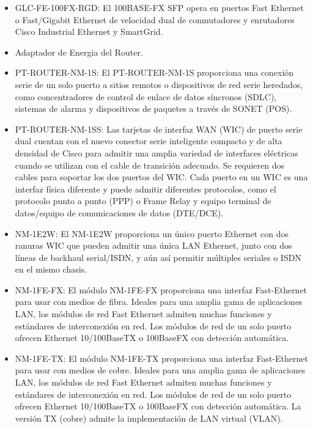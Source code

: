 \documentclass{article}
\begin{document}
\begin{itemize}
    \item GLC-FE-100FX-RGD: El 100BASE-FX SFP opera en puertos Fast Ethernet o Fast/Gigabit Ethernet de velocidad dual de conmutadores y enrutadores Cisco Industrial Ethernet y SmartGrid.

    \item Adaptador de Energia del Router.

    \item PT-ROUTER-NM-1S: El PT-ROUTER-NM-1S proporciona una conexión serie de un solo puerto a sitios remotos o dispositivos de red serie heredados, como concentradores de control de enlace de datos síncronos (SDLC), sistemas de alarma y dispositivos de paquetes a través de SONET (POS).

    \item PT-ROUTER-NM-1SS: Las tarjetas de interfaz WAN (WIC) de puerto serie dual cuentan con el nuevo conector serie inteligente compacto y de alta densidad de Cisco para admitir una amplia variedad de interfaces eléctricas cuando se utilizan con el cable de transición adecuado. Se requieren dos cables para soportar los dos puertos del WIC. Cada puerto en un WIC es una interfaz física diferente y puede admitir diferentes protocolos, como el protocolo punto a punto (PPP) o Frame Relay y equipo terminal de datos/equipo de comunicaciones de datos (DTE/DCE).

    \item NM-1E2W: El NM-1E2W proporciona un único puerto Ethernet con dos ranuras WIC que pueden admitir una única LAN Ethernet, junto con dos líneas de backhaul serial/ISDN, y aún así permitir múltiples seriales o ISDN en el mismo chasis.

    \item NM-1FE-FX: El módulo NM-1FE-FX proporciona una interfaz Fast-Ethernet para usar con medios de fibra. Ideales para una amplia gama de aplicaciones LAN, los módulos de red Fast Ethernet admiten muchas funciones y estándares de interconexión en red. Los módulos de red de un solo puerto ofrecen Ethernet 10/100BaseTX o 100BaseFX con detección automática.

    \item NM-1FE-TX: El módulo NM-1FE-TX proporciona una interfaz Fast-Ethernet para usar con medios de cobre. Ideales para una amplia gama de aplicaciones LAN, los módulos de red Fast Ethernet admiten muchas funciones y estándares de interconexión en red. Los módulos de red de un solo puerto ofrecen Ethernet 10/100BaseTX o 100BaseFX con detección automática. La versión TX (cobre) admite la implementación de LAN virtual (VLAN).


\end{itemize}
\end{document}
